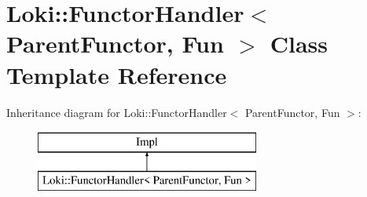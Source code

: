 \hypertarget{classLoki_1_1FunctorHandler}{}\section{Loki\+:\+:Functor\+Handler$<$ Parent\+Functor, Fun $>$ Class Template Reference}
\label{classLoki_1_1FunctorHandler}
Inheritance diagram for Loki\+:\+:Functor\+Handler$<$ Parent\+Functor, Fun $>$\+:\begin{figure}[H]
\begin{center}
\leavevmode
\includegraphics[height=2.000000cm]{classLoki_1_1FunctorHandler}
\end{center}
\end{figure}
